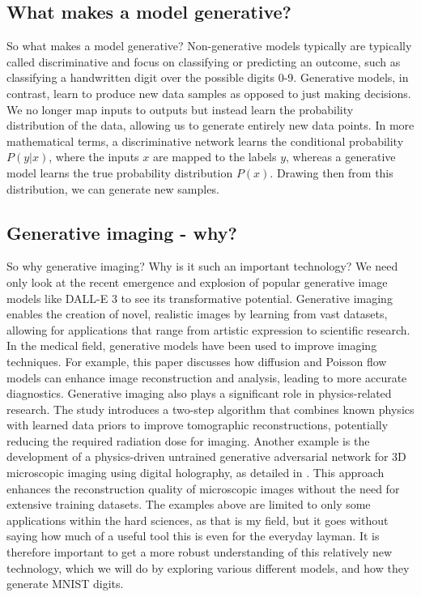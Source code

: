 \documentclass{article}
\begin{document}
\subsection{What makes a model generative?}
So what makes a model generative? Non-generative models typically are typically called discriminative and focus on classifying or predicting an outcome, such as classifying a handwritten digit over the possible digits 0-9. Generative models, in contrast, learn to produce new data samples as opposed to just making decisions. We no longer map inputs to outputs but instead learn the probability distribution of the data, allowing us to generate entirely new data points.
\newline
In more mathematical terms, a discriminative network learns the conditional probability $P(y | x)$, where the inputs $x$ are mapped to the labels $y$, whereas a generative model learns the true probability distribution $P(x)$. Drawing then from this distribution, we can generate new samples.
\newpage
\subsection{Generative imaging - why?}
So why generative imaging? Why is it such an important technology? We need only look at the recent emergence and explosion of popular generative image models like DALL-E 3 to see its transformative potential. Generative imaging enables the creation of novel, realistic images by learning from vast datasets, allowing for applications that range from artistic expression to scientific research.
\newline
In the medical field, generative models have been used to improve imaging techniques. For example, this paper \cite{hein2024physicsinspiredgenerativemodelsmedical} discusses how diffusion and Poisson flow models can enhance image reconstruction and analysis, leading to more accurate diagnostics.
\newline
Generative imaging also plays a significant role in physics-related research. The study \cite{Guo_2022} introduces a two-step algorithm that combines known physics with learned data priors to improve tomographic reconstructions, potentially reducing the required radiation dose for imaging. 
\newline
Another example is the development of a physics-driven untrained generative adversarial network for 3D microscopic imaging using digital holography, as detailed in \cite{chen2022dhganphysicsdrivenuntrainedgenerative}. This approach enhances the reconstruction quality of microscopic images without the need for extensive training datasets.
\newline
The examples above are limited to only some applications within the hard sciences, as that is my field, but it goes without saying how much of a useful tool this is even for the everyday layman. It is therefore important to get a more robust understanding of this relatively new technology, which we will do by exploring various different models, and how they generate MNIST digits.
\newpage
\end{document}

